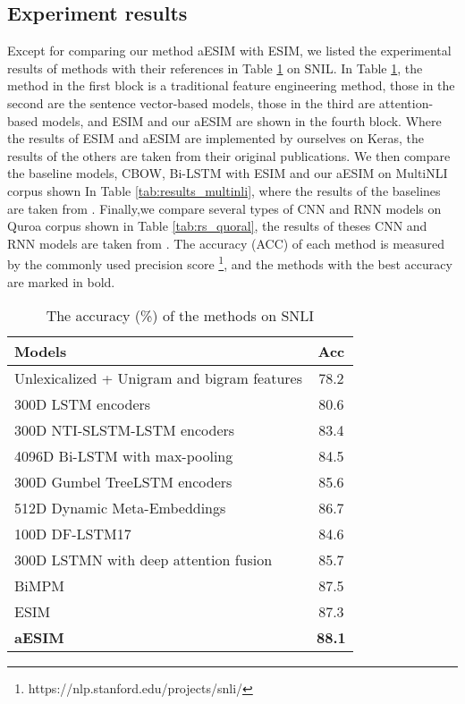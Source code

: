 \documentclass[10pt,sigconf]{acmart}
\begin{document}
\subsection{Experiment results}
Except for comparing our method aESIM with ESIM, we listed the experimental results of methods with their references in Table \ref{tab:snli_result} on SNIL. In Table \ref{tab:snli_result}, the method in the first block is a traditional feature engineering method, those in the second are the sentence vector-based models, those in the third are attention-based models, and ESIM and our aESIM are shown in the fourth block. Where the results of ESIM and aESIM are implemented by ourselves on Keras, the results of the others are taken from their original publications. We then compare the baseline models, CBOW, Bi-LSTM with ESIM and our aESIM on MultiNLI corpus shown In Table \ref{tab:results_multinli}, where the results of the baselines are taken from \cite{williams2017broad}. Finally,we compare several types of CNN and RNN models on Quroa corpus shown in Table \ref{tab:rs_quoral}, the results of theses CNN and RNN models are taken from \cite{wang2017bilateral}. The accuracy (ACC) of each method is measured by the commonly used precision score \footnote{https://nlp.stanford.edu/projects/snli/}, and the methods with the best accuracy are marked in bold.

\begin{table}[h]
    \centering
    \begin{tabular}{l|c}
        \hline
        \textbf{Models} & \textbf{Acc} \\
        \hline
         Unlexicalized + Unigram and bigram features \cite{bowman2015large} & 78.2 \\
        \hline
        300D LSTM encoders \cite{bowman2015large} & 80.6 \\
        300D NTI-SLSTM-LSTM encoders \cite{munkhdalai2017neural} & 83.4\\
        4096D Bi-LSTM with max-pooling \cite{conneau2017supervised} & 84.5 \\
        300D Gumbel TreeLSTM encoders \cite{choi2018learning} & 85.6\\
        512D Dynamic Meta-Embeddings \cite{kiela2018dynamic} & 86.7 \\
        \hline
        100D DF-LSTM17 \cite{liu2016deep}&84.6\\
        300D LSTMN with deep attention fusion \cite{cheng2016long}&85.7\\
        BiMPM \cite{wang2017bilateral}&87.5\\
        \hline
        ESIM & 87.3\\
        {\bf aESIM}& {\bf 88.1}\\
        \hline
    \end{tabular}
    \caption{The accuracy (\%) of the methods on SNLI}
    \label{tab:snli_result}
\end{table}
\end{document}
